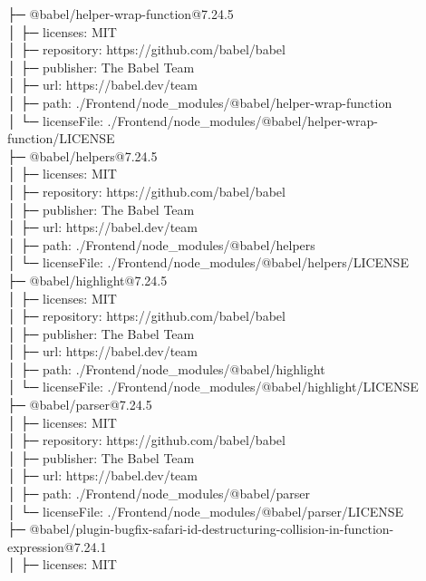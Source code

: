 \documentclass[
    paper=a4,
    twoside=false,
    parskip=half,
    listof=entryprefix,
    listof=totoc,
    index=totoc,
    bibliography=totoc,
    headsepline,
]{scrbook}
\begin{document}
    ├─ @babel/helper-wrap-function@7.24.5\\
    │  ├─ licenses: MIT\\
    │  ├─ repository: https://github.com/babel/babel\\
    │  ├─ publisher: The Babel Team\\
    │  ├─ url: https://babel.dev/team\\
    │  ├─ path: ./Frontend/node\_modules/@babel/helper-wrap-function\\
    │  └─ licenseFile: ./Frontend/node\_modules/@babel/helper-wrap-function/LICENSE\\
    ├─ @babel/helpers@7.24.5\\
    │  ├─ licenses: MIT\\
    │  ├─ repository: https://github.com/babel/babel\\
    │  ├─ publisher: The Babel Team\\
    │  ├─ url: https://babel.dev/team\\
    │  ├─ path: ./Frontend/node\_modules/@babel/helpers\\
    │  └─ licenseFile: ./Frontend/node\_modules/@babel/helpers/LICENSE\\
    ├─ @babel/highlight@7.24.5\\
    │  ├─ licenses: MIT\\
    │  ├─ repository: https://github.com/babel/babel\\
    │  ├─ publisher: The Babel Team\\
    │  ├─ url: https://babel.dev/team\\
    │  ├─ path: ./Frontend/node\_modules/@babel/highlight\\
    │  └─ licenseFile: ./Frontend/node\_modules/@babel/highlight/LICENSE\\
    ├─ @babel/parser@7.24.5\\
    │  ├─ licenses: MIT\\
    │  ├─ repository: https://github.com/babel/babel\\
    │  ├─ publisher: The Babel Team\\
    │  ├─ url: https://babel.dev/team\\
    │  ├─ path: ./Frontend/node\_modules/@babel/parser\\
    │  └─ licenseFile: ./Frontend/node\_modules/@babel/parser/LICENSE\\
    ├─ @babel/plugin-bugfix-safari-id-destructuring-collision-in-function-expression@7.24.1\\
    │  ├─ licenses: MIT\\
\end{document}
